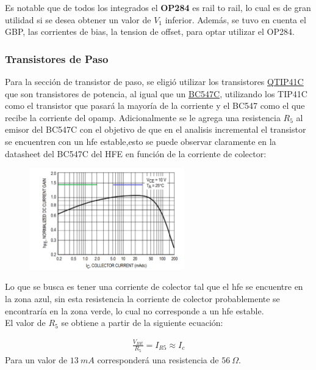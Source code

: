 Es notable que de todos los integrados el \textbf{OP284} es rail to rail, lo cual es de gran utilidad si se desea obtener un valor de $V_1$ inferior. Además, se tuvo en cuenta el GBP, las corrientes de bias, la tension de offset, para optar utilizar el OP284.

\subsubsection{Transistores de Paso}

Para la sección de transistor de paso, se eligió utilizar los transistores \href{https://pdf1.alldatasheet.com/datasheet-pdf/view/532914/FAIRCHILD/TIP31C.html}{QTIP41C} que son transistores de potencia, al igual que un \href{https://pdf1.alldatasheet.com/datasheet-pdf/view/2895/MOTOROLA/BC547C.html}{BC547C}, utilizando los TIP41C como el transistor que pasará la mayoría de la corriente y el BC547 como el que recibe la corriente del opamp.
Adicionalmente se le agrega una resistencia $R_5$ al emisor del BC547C con el objetivo de que en el analisis incremental el transistor se encuentren con un hfe estable,esto se puede observar claramente en la datasheet del BC547C del HFE en función de la corriente de colector:
\begin{figure}[H]
\centering
	\includegraphics[width=0.6\textwidth, page=1]{ImagenesEjercicio2/hfe547b.png}
\end{figure}
Lo que se busca es tener una corriente de colector tal que el hfe se encuentre en la zona azul, sin esta resistencia la corriente de colector probablemente se encontraría en la zona verde, lo cual no corresponde a un hfe estable.\\ 

El valor de $R_5$ se obtiene a partir de la siguiente ecuación:

\begin{align}
\frac{V_{BE}}{R_5}=I_{R5}\approx I_c
\end{align}
Para un valor de $13 \ mA$ corresponderá una resistencia de $56 \ \Omega$.

